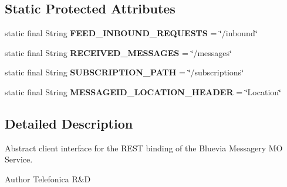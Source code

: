 \subsection*{Static Protected Attributes}
\begin{DoxyCompactItemize}
\item 
\hypertarget{classcom_1_1bluevia_1_1messagery_1_1mo_1_1client_1_1BVMoClient_adadbc1742813d784ae4baba346ff3bb6}{
static final String {\bfseries FEED\_\-INBOUND\_\-REQUESTS} = \char`\"{}/inbound\char`\"{}}
\label{classcom_1_1bluevia_1_1messagery_1_1mo_1_1client_1_1BVMoClient_adadbc1742813d784ae4baba346ff3bb6}

\item 
\hypertarget{classcom_1_1bluevia_1_1messagery_1_1mo_1_1client_1_1BVMoClient_a6c0a1e064c1b717a0459e1269f4ef681}{
static final String {\bfseries RECEIVED\_\-MESSAGES} = \char`\"{}/messages\char`\"{}}
\label{classcom_1_1bluevia_1_1messagery_1_1mo_1_1client_1_1BVMoClient_a6c0a1e064c1b717a0459e1269f4ef681}

\item 
\hypertarget{classcom_1_1bluevia_1_1messagery_1_1mo_1_1client_1_1BVMoClient_aafa6b8a73c7de1c4ffeaa4d540f4c738}{
static final String {\bfseries SUBSCRIPTION\_\-PATH} = \char`\"{}/subscriptions\char`\"{}}
\label{classcom_1_1bluevia_1_1messagery_1_1mo_1_1client_1_1BVMoClient_aafa6b8a73c7de1c4ffeaa4d540f4c738}

\item 
\hypertarget{classcom_1_1bluevia_1_1messagery_1_1mo_1_1client_1_1BVMoClient_a76ef248ac11ac6b7ab019cf259b03128}{
static final String {\bfseries MESSAGEID\_\-LOCATION\_\-HEADER} = \char`\"{}Location\char`\"{}}
\label{classcom_1_1bluevia_1_1messagery_1_1mo_1_1client_1_1BVMoClient_a76ef248ac11ac6b7ab019cf259b03128}

\end{DoxyCompactItemize}


\subsection{Detailed Description}
Abstract client interface for the REST binding of the Bluevia Messagery MO Service.

\begin{DoxyAuthor}{Author}
Telefonica R\&D 
\end{DoxyAuthor}


